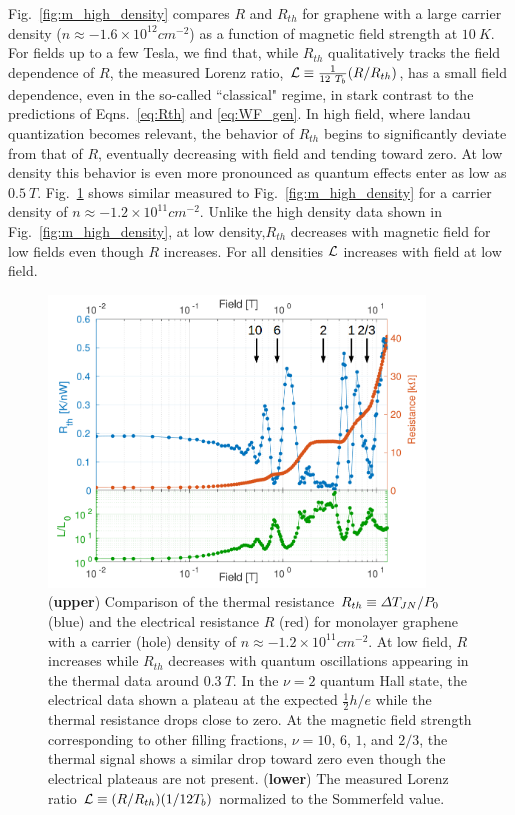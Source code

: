 Fig.~\ref{fig:m_high_density} compares $R$ and $R_{th}$ for graphene with a large carrier density ($n\approx -1.6\times10^{12}cm^{-2}$) as a function of magnetic field strength at $10~K$. For fields up to a few Tesla, we find that, while $R_{th}$ qualitatively tracks the field dependence of $R$, the measured Lorenz ratio, $\mathcal{L}\equiv \frac{1}{12~T_b} (R/R_{th})$, has a small field dependence, even in the so-called ``classical" regime, in stark contrast to the predictions of Eqns.~\ref{eq:Rth} and \ref{eq:WF_gen}. In high field, where landau quantization becomes relevant, the behavior of $R_{th}$ begins to significantly deviate from that of $R$, eventually decreasing with field and tending toward zero. At low density this behavior is even more pronounced as quantum effects enter as low as $0.5~T$. Fig.~\ref{fig:m_low_density} shows similar measured to Fig.~\ref{fig:m_high_density} for a carrier density of $n\approx-1.2\times10^{11}cm^{-2}$. Unlike the high density data shown in Fig.~\ref{fig:m_high_density}, at low density,$R_{th}$ decreases with magnetic field for low fields even though $R$ increases. For all densities $\mathcal{L}$ increases with field at low field.
\begin{figure}
\centering
\includegraphics[width=100mm]{figures/magneto/low_density.png}
\caption{(\textbf{upper}) Comparison of the thermal resistance $R_{th}\equiv \Delta T_{JN}/P_0$ (blue) and the electrical resistance $R$ (red) for monolayer graphene with a carrier (hole) density of $n\approx-1.2\times10^{11}cm^{-2}$. At low field, $R$ increases while $R_{th}$ decreases with quantum oscillations appearing in the thermal data around $0.3~T$. In the $\nu=2$ quantum Hall state, the electrical data shown a plateau at the expected $\frac{1}{2} h/e$ while the thermal resistance drops close to zero. At the magnetic field strength corresponding to other filling fractions, $\nu=10$, $6$, $1$, and $2/3$, the thermal signal shows a similar drop toward zero even though the electrical plateaus are not present. (\textbf{lower}) The measured Lorenz ratio $\mathcal{L} \equiv (R/R_{th})(1/12T_b)$ normalized to the Sommerfeld value.}
\label{fig:m_low_density}
\end{figure}

